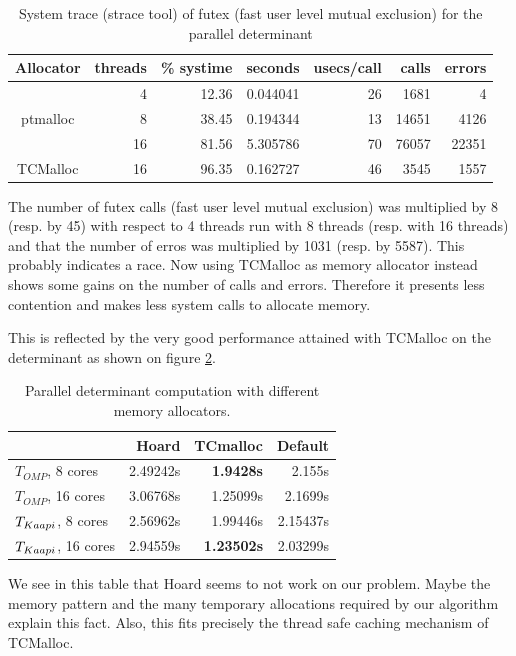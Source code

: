 \documentclass{article}
\newcommand{\kaapi}{{\sc Kaapi}\xspace}
\begin{document}
\begin{table}[htb]\center
\begin{tabular}{|c|r||r|r|r|r|r|}
\hline
Allocator& threads& \% systime & seconds & usecs/call & calls & errors\\
\hline
\multirow{3}{*}{ptmalloc}& 4& 12.36 &0.044041 &26 &1681& 4\\
&8& 38.45 &0.194344 &13 &14651& 4126\\
&16&81.56 &5.305786 &70 &76057& 22351\\
\hline
TCMalloc& 16& 96.35& 0.162727& 46& 3545& 1557\\
\hline
\end{tabular}
\caption{System trace (strace tool) of futex (fast user level mutual
  exclusion) for the parallel determinant}\label{tab:futex}
\end{table}

The number of futex calls (fast user level mutual
  exclusion) was multiplied by 8 (resp. by 45) with respect to 4
  threads run with 8 threads (resp. with 16 threads) and that the
  number of erros was multiplied by 1031 (resp. by 5587).
  This probably indicates a race.
Now using TCMalloc as memory allocator instead shows some gains on the
number of calls and errors. Therefore it presents less contention
and makes less system calls to allocate memory.

This is reflected by the very good performance attained with TCMalloc
on the determinant as shown on figure \ref{tab:allocs}.

\begin{table}[htb]\center
\begin{tabular}{|l||r|r|r|}
\hline
& Hoard & TCmalloc & Default\\
\hline
$T_{OMP}$, 8 cores& 2.49242s&\bf 1.9428s& 2.155s\\
$T_{OMP}$, 16 cores& 3.06768s& 1.25099s& 2.1699s\\
\hline
$T_{\kaapi}$, 8 cores& 2.56962s& 1.99446s& 2.15437s\\
$T_{\kaapi}$, 16 cores& 2.94559s&\bf 1.23502s& 2.03299s\\
\hline
\end{tabular}\caption{Parallel determinant computation with different
  memory allocators.}\label{tab:allocs}
\end{table}

We see in this table that Hoard seems to not work on our problem.
Maybe the memory pattern and the many temporary allocations required by
our algorithm explain this fact. Also, this fits precisely the thread
safe caching mechanism of TCMalloc.
\end{document}
